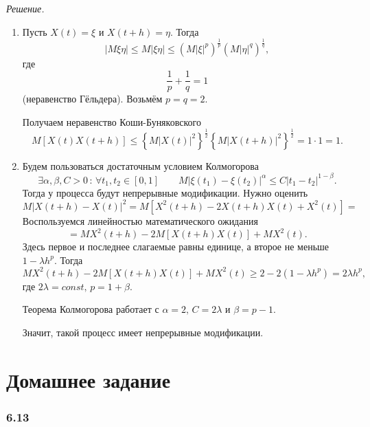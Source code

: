 \textit{Решение.}
\begin{enumerate}[label=\alph*)]
  \item Пусть $X \left( t \right) = \xi $ и $X \left( t + h \right) = \eta $.
  Тогда
  $$ \left| M \xi \eta \right| \leq
    M \left| \xi \eta \right| \leq
    \left( M \left| \xi \right|^p \right)^{ \frac{1}{p}}
    \left( M \left| \eta \right|^q \right)^{ \frac{1}{q}},$$
  где
  $$ \frac{1}{p} + \frac{1}{q} =
    1$$
  (неравенство Гёльдера).
  Возьмём $p = q = 2$.

  Получаем неравенство Коши-Буняковского
  $$M \left[ X \left( t \right) X \left( t + h \right) \right] \leq
    \left\{ M \left| X \left( t \right) \right|^2 \right\}^{ \frac{1}{2}}
    \left\{ M \left| X \left( t + h \right) \right|^2 \right\}^{ \frac{1}{2}} =
    1 \cdot 1 =
    1.$$
  \item Будем пользоваться достаточным условием Колмогорова
  $$ \exists \alpha, \beta, C > 0 \, : \,
    \forall t_1, t_2 \in \left[ 0, 1 \right] \qquad
    M \left| \xi \left( t_1 \right) - \xi \left( t_2 \right) \right|^{ \alpha } \leq
    C \left| t_1 - t_2 \right|^{1 - \beta }.$$
  Тогда у процесса будут непрерывные модификации.
  Нужно оценить
  $$M \left| X \left( t + h \right) - X \left( t \right) \right|^2 =
    M\left[X^2\left(t+h\right)-2X\left(t+h\right)X\left(t\right)+X^2\left(t\right)\right] =$$
  Воспользуемся линейностью математического ожидания
  $$= MX^2 \left( t + h \right) - 2M \left[  X \left( t + h \right) X \left( t \right) \right] +
    MX^2 \left( t \right).$$
  Здесь первое и последнее слагаемые равны единице, а второе не меньше $1 - \lambda h^p$.
  Тогда
  $$MX^2 \left( t + h \right) - 2M \left[  X \left( t + h \right) X \left( t \right) \right] +
    MX^2 \left( t \right) \geq
    2 - 2 \left( 1 - \lambda h^p \right) =
    2 \lambda h^p,$$
  где $2 \lambda = const, \, p = 1 + \beta $.

  Теорема Колмогорова работает с $ \alpha = 2, \, C = 2 \lambda $ и $ \beta = p - 1$.

  Значит, такой процесс имеет непрерывные модификации.
\end{enumerate}

\section*{Домашнее задание}

\subsubsection*{6.13}

